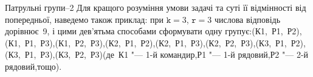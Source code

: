 {\begin{problemAllDefault}{Патрульні групи--2}
Для кращого розуміння умови задачі та суті її відмінності від попередньої, наведемо також приклад: при 
$\texttt{k}{=}3$, 
$\texttt{r}{=}3$
числова відповідь дорівнює~9, і цими дев'ятьма способами сформувати одну групу\nolinebreak[2] є:\hspace{1mm plus 1mm}\linebreak[2]
\mbox{(К1, Р1, Р2)},\hspace{1mm plus 1mm}\linebreak[2]
\mbox{(К1, Р1, Р3)},\hspace{1mm plus 1mm}\linebreak[2]
\mbox{(К1, Р2, Р3)},\hspace{1mm plus 1mm}\linebreak[2]
\mbox{(К2, Р1, Р2)},\hspace{1mm plus 1mm}\linebreak[2]
\mbox{(К2, Р1, Р3)},\hspace{1mm plus 1mm}\linebreak[2]
\mbox{(К2, Р2, Р3)},\hspace{1mm plus 1mm}\linebreak[2]
\mbox{(К3, Р1, Р2)},\hspace{1mm plus 1mm}\linebreak[2]
\mbox{(К3, Р1, Р3)},\hspace{1mm plus 1mm}\linebreak[2]
\mbox{(К3, Р2, Р3)}\hspace{1mm plus 1mm}\linebreak[2]
(де~К1 "--- \mbox{1-й} командир,\linebreak[2]
Р1 "--- \mbox{1-й} рядовий,\linebreak[2]
Р2 "--- \mbox{2-й} рядовий,\nolinebreak[3]
тощо).

\end{problemAllDefault}

}